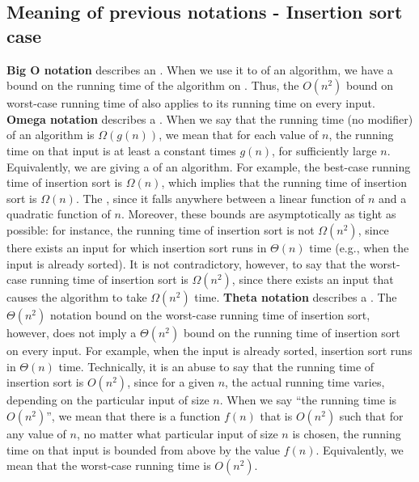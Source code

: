 \subsection{Meaning of previous notations - Insertion sort case}
\textbf{Big O notation}
\newline
describes an .
When we use it to  of an 
algorithm, we have a bound on the running time of the algorithm on .
\newline
Thus, the $O(n^2)$ bound on worst-case running time of  
also applies to its running time on every input.
\newline
\textbf{Omega notation} 
\newline
describes a .
When we say that the running time (no modifier) of an algorithm is $\Omega(g(n))$, 
we mean that 
 for
each value of $n$, the running time on that input is at least a constant 
times $g(n)$, for sufficiently large $n$.
\newline
Equivalently, we are giving a  
of an algorithm. For example, the best-case running time of insertion 
sort is $\Omega(n)$, which implies that the running time of insertion sort 
is $\Omega(n)$.
\newline
The , since it falls anywhere between a linear function of $n$ and 
a quadratic function of $n$.
Moreover, these bounds are asymptotically as tight as possible: 
for instance, the running time of insertion sort is not $\Omega(n^2)$, 
since there exists an input for which 
insertion sort runs in $\Theta(n)$ time 
(e.g., when the input is already sorted). 
It is not contradictory, however, 
to say that the worst-case running time of insertion sort is $\Omega(n^2)$, 
since there exists an input that causes the algorithm to take $\Omega(n^2)$ time.
\newline
\textbf{Theta notation}
\newline{}
describes a . The $\Theta(n^2)$ notation bound on the worst-case running time of insertion sort, however, 
does not imply a $\Theta(n^2)$ bound 
on the running time of insertion sort on every input. 
For example, when the input is already sorted, 
insertion sort runs in $\Theta(n)$ time.
Technically, 
it is an abuse to say that the running time of insertion sort is $O(n^2)$, 
since for a given $n$, 
the actual running time varies, depending on the particular input of size $n$. 
When we say ``the running time is $O(n^2)$'', 
we mean that 
there is a function $f(n)$ that is $O(n^2)$ 
such that for any value of $n$, 
no matter what particular input of size $n$ is chosen, 
the running time on that input is bounded from above by the value $f(n)$.
Equivalently, we mean that the worst-case running time is $O(n^2)$.

